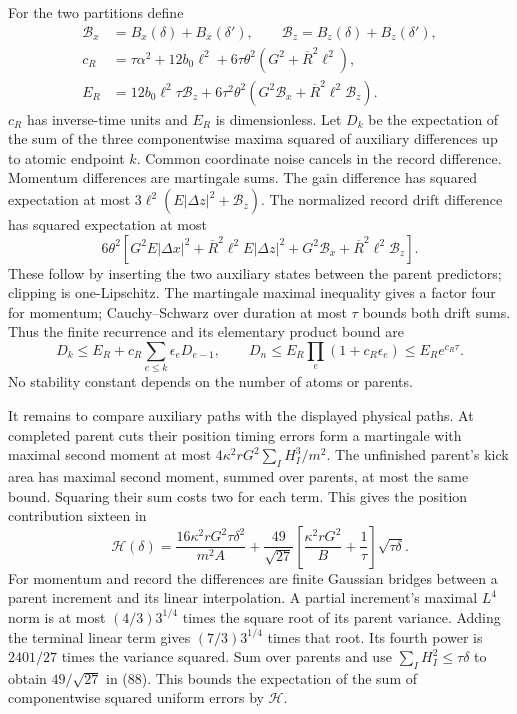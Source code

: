 \documentclass[11pt,a4paper]{article}
\begin{document}
For the two partitions define \[\begin{aligned}
\mathcal B_x&=B_x(\delta)+B_x(\delta'),\qquad
\mathcal B_z=B_z(\delta)+B_z(\delta'),\\
c_R&=\tau\alpha^2+12b_0\ell^2
                   +6\tau\theta^2(G^2+\overline R^2\ell^2),\\
E_R&=12b_0\ell^2\tau\mathcal B_z
 +6\tau^2\theta^2(G^2\mathcal B_x
                         +\overline R^2\ell^2\mathcal B_z).
\end{aligned}\tag{86}\] \(c_R\) has inverse-time units and \(E_R\) is
dimensionless. Let \(D_k\) be the expectation of the sum of the three
componentwise maxima squared of auxiliary differences up to atomic
endpoint \(k\). Common coordinate noise cancels in the record
difference. Momentum differences are martingale sums. The gain
difference has squared expectation at most
\(3\ell^2(E|\Delta z|^2+\mathcal B_z)\). The normalized record drift
difference has squared expectation at most \[6\theta^2[G^2E|\Delta x|^2
 +\overline R^2\ell^2E|\Delta z|^2
 +G^2\mathcal B_x+\overline R^2\ell^2\mathcal B_z].\] These follow by
inserting the two auxiliary states between the parent predictors;
clipping is one-Lipschitz. The martingale maximal inequality gives a
factor four for momentum; Cauchy--Schwarz over duration at most \(\tau\)
bounds both drift sums. Thus the finite recurrence and its elementary
product bound are \[D_k\le E_R+c_R\sum_{e\le k}\epsilon_eD_{e-1},\qquad
D_n\le E_R\prod_e(1+c_R\epsilon_e)
                    \le E_Re^{c_R\tau}.\tag{87}\] No stability constant
depends on the number of atoms or parents.

It remains to compare auxiliary paths with the displayed physical paths.
At completed parent cuts their position timing errors form a martingale
with maximal second moment at most \(4\kappa^2rG^2\sum_I H_I^3/m^2\).
The unfinished parent's kick area has maximal second moment, summed over
parents, at most the same bound. Squaring their sum costs two for each
term. This gives the position contribution sixteen in
\[\mathcal H(\delta)=
\frac{16\kappa^2rG^2\tau\delta^2}{m^2A}
+\frac{49}{\sqrt{27}}
       \left[\frac{\kappa^2rG^2}{B}+\frac1\tau\right]
                                  \sqrt{\tau\delta}.\tag{88}\] For
momentum and record the differences are finite Gaussian bridges between
a parent increment and its linear interpolation. A partial increment's
maximal \(L^4\) norm is at most \((4/3)3^{1/4}\) times the square root
of its parent variance. Adding the terminal linear term gives
\((7/3)3^{1/4}\) times that root. Its fourth power is \(2401/27\) times
the variance squared. Sum over parents and use
\(\sum_IH_I^2\le\tau\delta\) to obtain \(49/\sqrt{27}\) in (88). This
bounds the expectation of the sum of componentwise squared uniform
errors by \(\mathcal H\).
\end{document}
